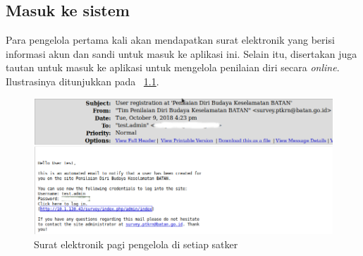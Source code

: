 \chapter{\babSatu}
\section{Masuk ke sistem}
Para pengelola pertama kali akan mendapatkan surat elektronik yang berisi informasi akun dan sandi untuk masuk ke aplikasi ini. Selain itu, disertakan juga tautan untuk masuk ke aplikasi untuk mengelola penilaian diri secara \textit{online}. Ilustrasinya ditunjukkan pada \figurename~\ref{fig:email4admin}.
\begin{figure}[h]
  \begin{center}
    \includegraphics[scale=.35]{pics/surat4admin.png}
    \caption{Surat elektronik pagi pengelola di setiap satker}
    \label{fig:email4admin}
  \end{center}
\end{figure}

